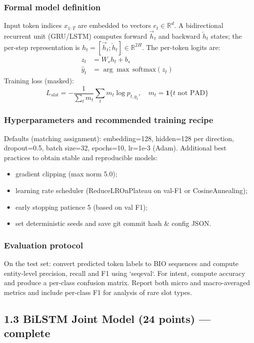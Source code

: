 \documentclass[conference]{IEEEtran}
\begin{document}
\subsubsection{Formal model definition}
Input token indices $x_{1:T}$ are embedded to vectors $e_t \in \mathbb{R}^{d}$. A bidirectional recurrent unit (GRU/LSTM) computes forward $\overrightarrow{h}_t$ and backward $\overleftarrow{h}_t$ states; the per-step representation is $h_t = [\overrightarrow{h}_t; \overleftarrow{h}_t] \in \mathbb{R}^{2H}$. The per-token logits are:
\begin{align}
z_t &= W_s h_t + b_s \\
\hat{y}_t &= \arg\max\, \text{softmax}(z_t)
\end{align}
Training loss (masked):
\begin{equation}
L_{slot} = -\frac{1}{\sum_t m_t} \sum_t m_t \log p_{t, y_t},\quad m_t = \mathbf{1}\{t\text{ not PAD}\}
\end{equation}

\subsubsection{Hyperparameters and recommended training recipe}
Defaults (matching assignment): embedding=128, hidden=128 per direction, dropout=0.5, batch size=32, epochs=10, lr=1e-3 (Adam). Additional best practices to obtain stable and reproducible models:
\begin{itemize}
  \item gradient clipping (max norm 5.0);
  \item learning rate scheduler (ReduceLROnPlateau on val-F1 or CosineAnnealing);
  \item early stopping patience 5 (based on val F1);
  \item set deterministic seeds and save git commit hash \& config JSON.
\end{itemize}

\subsubsection{Evaluation protocol}
On the test set: convert predicted token labels to BIO sequences and compute entity-level precision, recall and F1 using `seqeval`. For intent, compute accuracy and produce a per-class confusion matrix. Report both micro and macro-averaged metrics and include per-class F1 for analysis of rare slot types.

\subsection{1.3 BiLSTM Joint Model (24 points) — complete}
\end{document}
